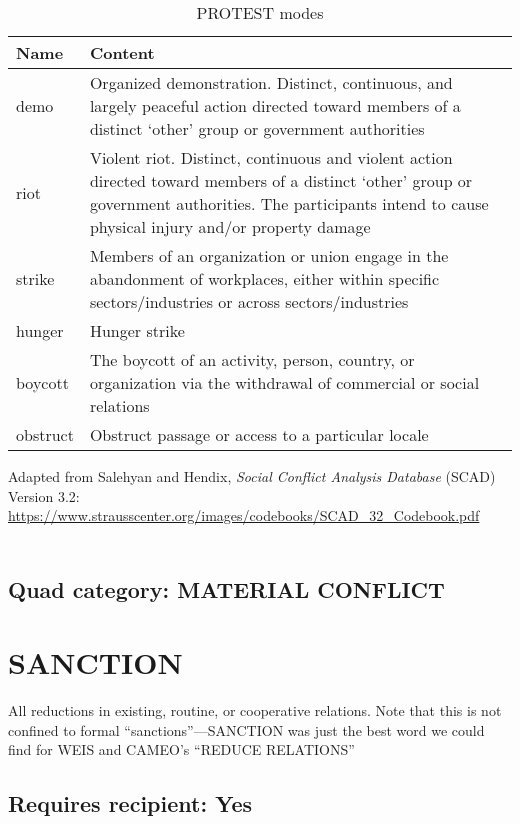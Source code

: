 \documentclass[11pt]{report}
\newcommand{\plcat}[1]{\textsf{#1}}
\begin{document}
\begin{table}[htp]
\caption{PROTEST modes}
\begin{center}
\begin{tabular}{|l|p{13cm}|}
\hline
Name & Content \\
\hline
demo & Organized demonstration. Distinct, continuous, and largely peaceful action directed toward
members of a distinct `other' group or government authorities  \\
riot & Violent riot. Distinct, continuous and violent action directed toward members of
a distinct `other' group or government authorities. The participants intend to cause physical injury and/or property damage \\
strike & Members of an organization or union engage in the abandonment of
workplaces, either within specific sectors/industries or across sectors/industries\\
hunger & Hunger strike\\
boycott & The boycott of an activity, person, country, or organization via the withdrawal of commercial or social relations\\
obstruct & Obstruct passage or access to a particular locale \\
\hline
\end{tabular}
\end{center}
\label{tab:protestmode}
\raggedright{Adapted from Salehyan and Hendix, \textit{Social Conflict Analysis Database} (SCAD)
Version 3.2: \url{https://www.strausscenter.org/images/codebooks/SCAD\_32\_Codebook.pdf}}\\~

\end{table}%

\subsection{Quad category: MATERIAL CONFLICT}

\newpage

\section{SANCTION}

All reductions in existing, routine, or cooperative relations. Note that this is not confined to formal ``sanctions''---\plcat{SANCTION} was just the best word we could find for WEIS and CAMEO's ``REDUCE RELATIONS''


\subsection{Requires recipient: Yes}
\end{document}
